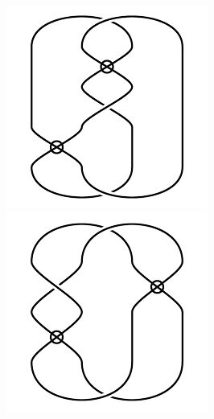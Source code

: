 \begin{figure}[H]
\begin{minipage}[b]{.18\linewidth}
\centering
\includegraphics[width=\linewidth]{../data/virtual_3_4.png}
\end{minipage}
\begin{minipage}[b]{.18\linewidth}
\centering
\includegraphics[width=\linewidth]{../data/virtual_3_5.png}

\end{minipage}
\end{figure}
